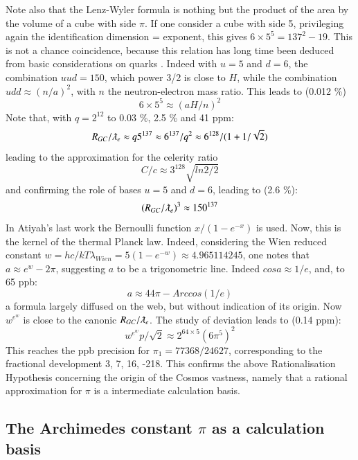 \documentclass[twoside,draft]{article}
\begin{document}
\begin{sloppypar}
{Note also that the Lenz-Wyler formula is nothing but the product of the area by the volume of a cube with side $\pi $. If one consider a cube with side 5, privileging again the identification dimension = exponent, this gives $6 \times 5^5 = 137^2 - 19 $. This is not a chance coincidence, because this relation has long time been deduced from basic considerations on quarks \cite{Sanchez1}. Indeed with $u = 5 $ and $d = 6 $, the combination $uud = 150 $, which power 3/2 is close to $H$, while the combination $udd \approx (n/a)^2 $, with $n$ the neutron-electron mass ratio. This leads to (0.012 \%) $$6\times 5^5 \approx (aH/n)^2 $$  
Note that, with $q = 2^{12}$ to 0.03 \%, 2.5 \% and 41 ppm:
$$R_{GC}/\lambdabar_e \approx q5^{137} \approx 6^{137}/q^2 \approx 6^{128}/(1+1/\sqrt2)$$
leading to the approximation for the celerity ratio $$ C/c\approx3^{128} \sqrt{ln2/2}$$ and confirming the role of bases $u = 5$ and $d = 6$, leading to (2.6 \%):
$$(R_{GC}/\lambdabar_e)^3 \approx 150^{137}$$
 In Atiyah's last work the Bernoulli function $x/(1-e^{-x})$ is used. Now, this is the kernel of the thermal Planck law. Indeed, considering the Wien reduced constant $w = hc/kT\lambda_{Wien} = 5 (1-e^{-w}) \approx 4.965114245$, one notes that $a \approx e^w -2\pi$, suggesting $a$ to be a trigonometric line. Indeed $cosa \approx 1/e$, and, to 65 ppb:
\begin{equation}
a \approx 44\pi - Arccos(1/e)
\end{equation}
a formula largely diffused on the web, but without indication of its origin. Now $w^{e^w}$ is close to the canonic $R_{GC}/\lambdabar_e$. The study of deviation leads to (0.14 ppm):
$$w^{e^w} p/\sqrt2 \approx 2^{64\times5} (6\pi^5)^2$$
This reaches the ppb precision for $\pi_1 = 77368/24627$, corresponding to the fractional development 3, 7, 16, -218. This confirms the above Rationalisation Hypothesis concerning the origin of the Cosmos vastness, namely
that a rational approximation for $\pi$ is a intermediate calculation basis. 

\subsection {The Archimedes constant $\pi$ as a calculation basis}

}
\end{sloppypar}
\end{document}
